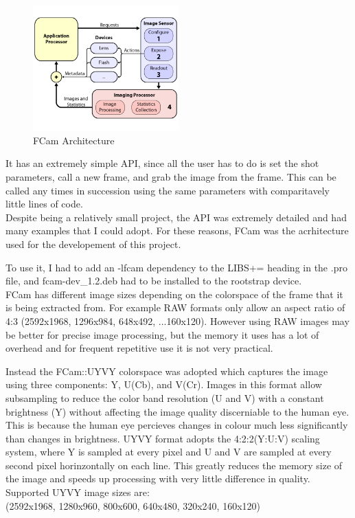 \begin{figure}
	\vspace{-40pt}
	\begin{center}
		\includegraphics[width=0.5\textwidth]{../images/fcam_arch}
	\end{center}
	\vspace{-20pt}
	\caption{FCam Architecture}
\end{figure}
It has an extremely simple API, since all the user has to do is set the shot parameters, call a new frame, and grab the image from the frame. This can be called any times in succession using the same parameters with comparitavely little lines of code.\\
Despite being a relatively small project, the API was extremely detailed and had many examples that I could adopt. For these reasons, FCam was the acrhitecture used for the developement of this project.

To use it, I had to add an -lfcam dependency to the LIBS+= heading in the .pro file, and fcam-dev\_1.2.deb had to be installed to the rootstrap device.\\

FCam has different image sizes depending on the colorspace of the frame that it is being extracted from. For example RAW formats only allow an aspect ratio of 4:3 (2592x1968, 1296x984, 648x492, ...160x120). However using RAW images may be better for precise image processing, but the memory it uses has a lot of overhead and for frequent repetitive use it is not very practical.

Instead the FCam::UYVY colorspace was adopted which captures the image using three components: Y, U(Cb), and V(Cr). 
Images in this format allow subsampling to reduce the color band resolution (U and V) with a constant brightness (Y) without affecting the image quality discerniable to the human eye. This is because the human eye percieves changes in colour much less significantly than changes in brightness. UYVY format adopts the 4:2:2(Y:U:V) scaling system, where Y is sampled at every pixel and U and V are sampled at every second pixel horinzontally on each line. This greatly reduces the memory size of the image and speeds up processing with very little difference in quality. Supported UYVY image sizes are:\\ (2592x1968, 1280x960, 800x600, 640x480, 320x240, 160x120)

